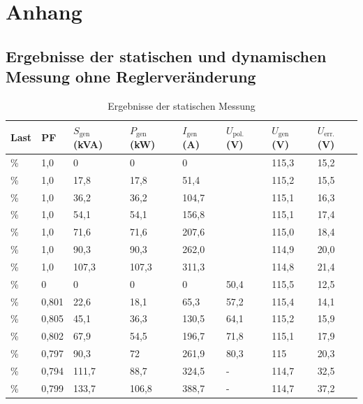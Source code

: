 \chapter{Anhang}
\label{chap:Anhang}
\section{Ergebnisse der statischen und dynamischen Messung ohne Reglerveränderung}

\begin{longtable}[]{llllllll}
\caption{Ergebnisse der statischen Messung}
\tabularnewline
\toprule
Last  & PF    & $S_{\mathrm{gen}}$ (kVA) & $P_{\mathrm{gen}}$ (kW) & $I_{\mathrm{gen}}$ (A) & $U_{\mathrm{pol.}}$ (V) & $U_{\mathrm{gen}}$ (V) & $U_{\mathrm{err.}}$ (V) \\ 
\midrule
\endhead
\unit[0]{\%}   & 1,0   & 0          & 0         & 0        &           & 115,3    & 15,2      \\
\unit[25]{\%}  & 1,0   & 17,8       & 17,8      & 51,4     &           & 115,2    & 15,5      \\
\unit[50]{\%}  & 1,0   & 36,2       & 36,2      & 104,7    &           & 115,1    & 16,3      \\
\unit[75]{\%}  & 1,0   & 54,1       & 54,1      & 156,8    &           & 115,1    & 17,4      \\
\unit[100]{\%} & 1,0   & 71,6       & 71,6      & 207,6    &           & 115,0    & 18,4      \\
\unit[125]{\%} & 1,0   & 90,3       & 90,3      & 262,0    &           & 114,9    & 20,0      \\
\unit[150]{\%} & 1,0   & 107,3      & 107,3     & 311,3    &           & 114,8    & 21,4      \\ \midrule
\unit[0]{\%}   & 0     & 0          & 0         & 0        & 50,4      & 115,5    & 12,5      \\
\unit[25]{\%}  & 0,801 & 22,6       & 18,1      & 65,3     & 57,2      & 115,4    & 14,1      \\
\unit[50]{\%}  & 0,805 & 45,1       & 36,3      & 130,5    & 64,1      & 115,2    & 15,9      \\
\unit[75]{\%}  & 0,802 & 67,9       & 54,5      & 196,7    & 71,8      & 115,1    & 17,9      \\
\unit[100]{\%} & 0,797 & 90,3       & 72        & 261,9    & 80,3      & 115      & 20,3      \\
\unit[125]{\%} & 0,794 & 111,7      & 88,7      & 324,5    & -         & 114,7    & 32,5      \\
\unit[150]{\%} & 0,799 & 133,7      & 106,8     & 388,7    & -         & 114,7    & 37,2      \\ \bottomrule
\end{longtable}

